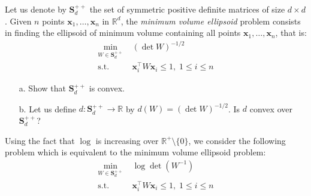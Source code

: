 \documentclass[11pt]{article}
\theoremstyle{remark}
\newcommand{\R}{\mathbb{R}}                     %
\newcommand{\bx}{\mathbf{x}}
\begin{document}
Let us denote by $\mathbf{S}_d^{++}$ the set of symmetric positive definite
matrices of size $d\times d$. Given $n$ points $\bx_1,\ldots, \bx_n$ in $\R^d$,
the \emph{minimum volume ellipsoid} problem consists in finding the ellipsoid
of minimum volume containing all points $\bx_1,\ldots, \bx_n$, that is:
\begin{displaymath}
    \begin{split}
        \min_{W\in\mathbf{S}_d^{++}}&\; (\det W)^{-1/2}\\
        \mathrm{s.t.}&\; \bx_i^\intercal W\bx_i\leq 1,\; 1\leq i\leq n
    \end{split}
\end{displaymath}

\begin{itemize}
    \item[a.] Show that $\mathbf{S}_d^{++}$ is convex.
    \item[b.] Let us define $d: \mathbf{S}_d^{++}\rightarrow\R$ by $d(W) = (\det W)^{-1/2}$. Is $d$ convex over $\mathbf{S}_d^{++}$?
\end{itemize}
Using the fact that $\log$ is increasing over $\R^+\setminus\{0\}$, we consider
the following problem which is equivalent to the minimum volume ellipsoid
problem:
\begin{equation}\label{P}
    \begin{split}
        \min_{W\in\mathbf{S}_d^{++}}&\; \log\det (W^{-1})\\
        \mathrm{s.t.}&\; \bx_i^\intercal W\bx_i\leq 1,\; 1\leq i\leq n
    \end{split}
\end{equation}
\end{document}
